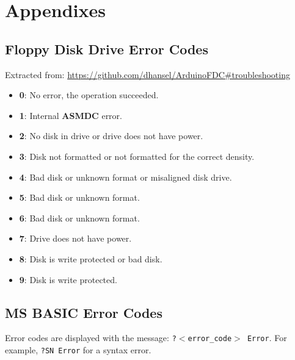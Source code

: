 \section{Appendixes}
\label{sec:appendixes}

    \subsection{Floppy Disk Drive Error Codes}

    Extracted from: \url{https://github.com/dhansel/ArduinoFDC#troubleshooting}

    \begin{itemize}
        \item \textbf{0}: No error, the operation succeeded.
        \item \textbf{1}: Internal \textbf{ASMDC} error.
        \item \textbf{2}: No disk in drive or drive does not have power.
        \item \textbf{3}: Disk not formatted or not formatted for the correct
        density.
        \item \textbf{4}: Bad disk or unknown format or misaligned disk drive.
        \item \textbf{5}: Bad disk or unknown format.
        \item \textbf{6}: Bad disk or unknown format.
        \item \textbf{7}: Drive does not have power.
        \item \textbf{8}: Disk is write protected or bad disk.
        \item \textbf{9}: Disk is write protected.
    \end{itemize}

    \subsection{MS BASIC  Error Codes}

    Error codes are displayed with the message: \texttt{?$<$error\_code$>$ Error}.
    For example, \texttt{?SN Error} for a syntax error.

